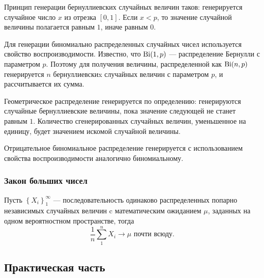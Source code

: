 \documentclass[12pt, a4paper]{article}
\begin{document}
Принцип генерации бернуллиевских случайных величин таков: генерируется случайное число $x$ из отрезка $\left[0,1\right]$. Если $x < p$, то значение случайной величины полагается равным $1$, иначе равным $0$.

Для генерации биномиально распределенных случайных чисел используется свойство воспроизводимости. Известно, что $\operatorname{Bi}(1,p)$ --- распределение Бернулли с параметром $p$. Поэтому для получения величины, распределенной как $\operatorname{Bi}(n,p)$ генерируется $n$ бернуллиевскиx случайных величин с параметром $p$, и рассчитывается их сумма.

Геометрическое распределение генерируется по определению: генерируются случайные бернуллиевские величины, пока значение следующей не станет равным $1$. Количество сгенерированных случайных величин, уменьшенное на единицу, будет значением искомой случайной величины.

Отрицательное биномиальное распределение генерируется с использованием свойства воспроизводимости аналогично биномиальному.

\subsubsection{Закон больших чисел}
\begin{theorem}\label{zbch}
Пусть $\left\{X_i\right\}_1^\infty$ --- последовательность одинаково распределенных попарно независимых случайных величин c математическим ожиданием $\mu$, заданных на одном вероятностном пространстве, тогда 
\[ \frac 1n \sum\limits_1^n X_i \to \mu \text{ почти всюду.}\]
\end{theorem}

\newpage

\subsection{Практическая часть}
\end{document}

